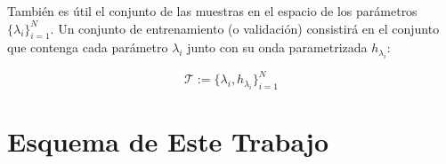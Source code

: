 También es útil el conjunto de las muestras en el espacio de los parámetros
$\{ \lambda_i \}_{i=1}^N$. 
Un conjunto de entrenamiento (o validación) consistirá en el conjunto que contenga cada parámetro $\lambda_i$ junto con su onda parametrizada $h_{\lambda_i}$:

\[
\mathcal{T} := \{ \lambda_i, h_{\lambda_i} \}_{i=1}^N
\]

\section{Esquema de Este Trabajo}



